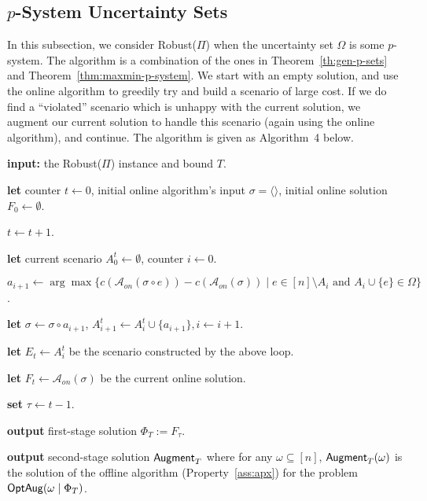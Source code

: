 \documentclass[11pt,letterpaper]{article}
\def\a{\ensuremath{\mathcal{A}}\xspace}
\def\cov{\ensuremath{\Pi}\xspace}
\def\rcov{{\sf Robust(\cov)}\xspace}
\def\fst{\ensuremath {\Phi_T}\xspace}
\def\snd{\ensuremath {{\sf Augment}_T}\xspace}
\newcommand{\sse}{\subseteq}
\newcommand{\online}{\alpha_{\sf on}}
\newcommand{\optaug}{{\sf OptAug}}
\begin{document}
\subsection{$p$-System Uncertainty Sets}
\label{subsec:framework-mat} In this subsection, we consider \rcov when the uncertainty set $\Omega$ is some
$p$-system. The algorithm is a combination of the ones in Theorem~\ref{th:gen-p-sets} and
Theorem~\ref{thm:maxmin-p-system}.  We start with an empty solution, and use the online algorithm to greedily try and
build a scenario of large cost. If we do find a ``violated'' scenario which is unhappy with the current solution, we
augment our current solution to handle this scenario (again using the online algorithm), and continue. The algorithm is
given as Algorithm~4 below.

\begin{algorithm}
  \caption{Algorithm Robust-with-$p$-system-Uncertainty-Sets }
  \begin{algorithmic}[1]
  \STATE \textbf{input:} the \rcov instance and bound $T$.

    \STATE \textbf{let} counter $t\leftarrow 0$, initial online
    algorithm's input $\sigma = \langle\rangle$, initial online solution
    $F_0\leftarrow \emptyset$.

    \REPEAT

   $t\leftarrow t+1$.

    \STATE \textbf{let} current scenario $A^t_0 \gets \emptyset$,
    counter $i\leftarrow 0$.


    \STATE $a_{i+1}\leftarrow \arg\max\{ c(\a_{on}(\sigma \circ e)) -
    c(\a_{on}(\sigma)) \mid e\in [n]\setminus A_i \text{ and } A_i \cup
    \{e\}\in \Omega\}$.

    \STATE \textbf{let} $\sigma \gets \sigma \circ a_{i+1}$,
    $A^t_{i+1} \gets A^t_i \cup \{a_{i+1}\}, i \gets i+1$.

    \ENDWHILE

    \STATE \label{step:mm} \textbf{let} $E_t \gets A^t_i$ be the
    scenario constructed by the above loop.

    \STATE \label{step:online} \textbf{let} $F_t \gets
    \a_{on}(\sigma)$ be the current online solution.


    \UNTIL{$c(F_t) - c(F_{t-1}) \le 2\online \cdot
      T$} \label{step:aug}

\STATE  \textbf{set} $\tau \leftarrow t-1$.

    \STATE \textbf{output} first-stage solution $\fst:=F_{\tau}$.

  \STATE \textbf{output} second-stage solution $\snd$ where for any $\omega\sse[n]$, $\snd(\omega)$ is the solution of
  the offline algorithm (Property~\ref{ass:apx}) for the problem $\optaug(\omega\mid \fst)$.

\end{algorithmic}
\end{algorithm}
\end{document}
